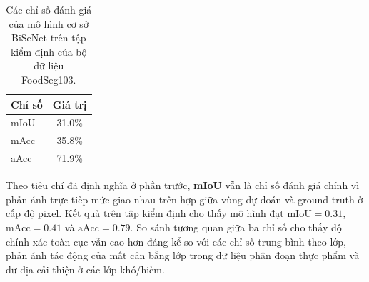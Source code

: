 \begin{table}[H]
    \centering
    \caption{Các chỉ số đánh giá của mô hình cơ sở BiSeNet trên tập kiểm định của bộ dữ liệu FoodSeg103.}
    \label{tab:bisenet-baseline-results}
    \footnotesize
    \begin{tabular}{lc}
        \toprule
        \textbf{Chỉ số} & \textbf{Giá trị} \\
        \midrule
        mIoU & 31.0\% \\
        mAcc & 35.8\% \\
        aAcc & 71.9\% \\
        \bottomrule
    \end{tabular}
\end{table}

Theo tiêu chí đã định nghĩa ở phần trước, \textbf{mIoU} vẫn là chỉ số đánh giá chính vì phản ánh trực tiếp mức giao nhau trên hợp giữa vùng dự đoán và ground truth ở cấp độ pixel. Kết quả trên tập kiểm định cho thấy mô hình đạt $\mathrm{mIoU}=0.31$, $\mathrm{mAcc}=0.41$ và $\mathrm{aAcc}=0.79$. So sánh tương quan giữa ba chỉ số cho thấy độ chính xác toàn cục vẫn cao hơn đáng kể so với các chỉ số trung bình theo lớp, phản ánh tác động của mất cân bằng lớp trong dữ liệu phân đoạn thực phẩm và dư địa cải thiện ở các lớp khó/hiếm.


